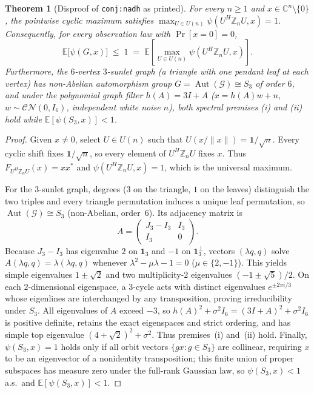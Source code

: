 \documentclass[11pt]{article}
\theoremstyle{plain}
\newtheorem{theorem}{Theorem}
\theoremstyle{definition}
\theoremstyle{remark}
\DeclareMathOperator{\Aut}{Aut}
\begin{document}
\begin{theorem}[Disproof of \texttt{conj:nadh} as printed]\label{thm:nadh}
For every $n \ge 1$ and $x \in \mathbb{C}^n \setminus \{0\}$, the pointwise cyclic maximum satisfies $\max_{U \in U(n)} \psi(U^H \mathbb{Z}_n U, x) = 1$. Consequently, for every observation law with $\Pr[x = 0] = 0$,
\[
\mathbb{E}\bigl[\psi(G, x)\bigr] \;\le\; 1 \;=\; \mathbb{E}\!\left[\max_{U \in U(n)} \psi(U^H \mathbb{Z}_n U, x)\right].
\]
Furthermore, the $6$-vertex $3$-sunlet graph (a triangle with one pendant leaf at each vertex) has non-Abelian automorphism group $G = \Aut(\mathcal{G}) \cong S_3$ of order $6$, and under the polynomial graph filter $h(A) = 3I + A$ ($x = h(A)w + n$, $w \sim \mathcal{CN}(0, I_6)$, independent white noise $n$), both spectral premises \textup{(i)} and \textup{(ii)} hold while $\mathbb{E}[\psi(S_3, x)] < 1$.
\end{theorem}

\begin{proof}
Given $x \neq 0$, select $U \in U(n)$ such that $U(x/\|x\|) = \mathbf{1}/\sqrt{n}$. Every cyclic shift fixes $\mathbf{1}/\sqrt{n}$, so every element of $U^H \mathbb{Z}_n U$ fixes $x$. Thus $F_{U^H \mathbb{Z}_n U}(x) = xx^*$ and $\psi(U^H \mathbb{Z}_n U, x) = 1$, which is the universal maximum.

For the $3$-sunlet graph, degrees ($3$ on the triangle, $1$ on the leaves) distinguish the two triples and every triangle permutation induces a unique leaf permutation, so $\Aut(\mathcal{G}) \cong S_3$ (non-Abelian, order~$6$). Its adjacency matrix is
\[
A = \begin{pmatrix} J_3 - I_3 & I_3 \\ I_3 & 0 \end{pmatrix}.
\]
Because $J_3 - I_3$ has eigenvalue $2$ on $\mathbf{1}_3$ and $-1$ on $\mathbf{1}_3^\perp$, vectors $(\lambda q, q)$ solve $A(\lambda q, q) = \lambda(\lambda q, q)$ whenever $\lambda^2 - \mu\lambda - 1 = 0$ ($\mu \in \{2, -1\}$). This yields simple eigenvalues $1 \pm \sqrt{2}$ and two multiplicity-$2$ eigenvalues $(-1 \pm \sqrt{5})/2$. On each $2$-dimensional eigenspace, a $3$-cycle acts with distinct eigenvalues $e^{\pm 2\pi i/3}$ whose eigenlines are interchanged by any transposition, proving irreducibility under $S_3$. All eigenvalues of $A$ exceed $-3$, so $h(A)^2 + \sigma^2 I_6 = (3I + A)^2 + \sigma^2 I_6$ is positive definite, retains the exact eigenspaces and strict ordering, and has simple top eigenvalue $(4+\sqrt{2})^2 + \sigma^2$. Thus premises~(i) and~(ii) hold. Finally, $\psi(S_3, x) = 1$ holds only if all orbit vectors $\{gx : g \in S_3\}$ are collinear, requiring $x$ to be an eigenvector of a nonidentity transposition; this finite union of proper subspaces has measure zero under the full-rank Gaussian law, so $\psi(S_3, x) < 1$ a.s.\ and $\mathbb{E}[\psi(S_3, x)] < 1$.
\end{proof}
\end{document}
